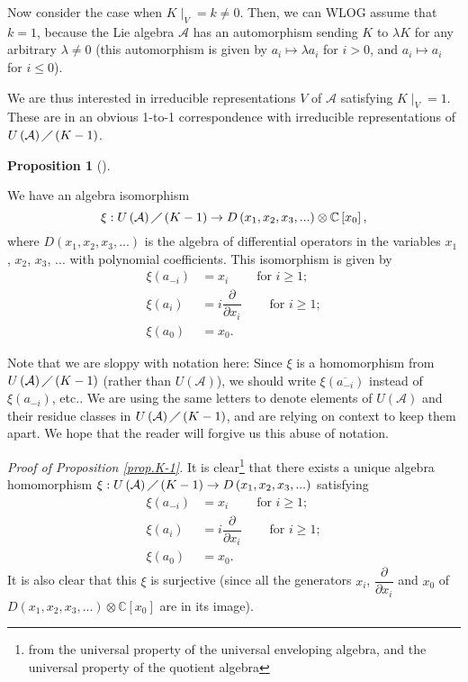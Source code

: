 \documentclass
[numbers=enddot,12pt,final,onecolumn,german,notitlepage]{scrartcl}%
\theoremstyle{definition}
\newtheorem{prop}[theo]{Proposition}
\newenvironment{proposition}[1][]
{\begin{prop}[#1]\begin{leftbar}}
{\end{leftbar}\end{prop}}
\begin{document}
Now consider the case when $K\mid_{V}=k\neq0$. Then, we can WLOG assume that
$k=1$, because the Lie algebra $\mathcal{A}$ has an automorphism sending $K$
to $\lambda K$ for any arbitrary $\lambda\neq0$ (this automorphism is given by
$a_{i}\mapsto\lambda a_{i}$ for $i>0$, and $a_{i}\mapsto a_{i}$ for $i\leq0$).

We are thus interested in irreducible representations $V$ of $\mathcal{A}$
satisfying $K\mid_{V}=1$. These are in an obvious 1-to-1 correspondence with
irreducible representations of $U\left(  \mathcal{A}\right)  \diagup\left(
K-1\right)  $.

\begin{proposition}
\label{prop.K-1}We have an algebra isomorphism%
\[
\xi:U\left(  \mathcal{A}\right)  \diagup\left(  K-1\right)  \rightarrow
D\left(  x_{1},x_{2},x_{3},...\right)  \otimes\mathbb{C}\left[  x_{0}\right]
,
\]
where $D\left(  x_{1},x_{2},x_{3},...\right)  $ is the algebra of differential
operators in the variables $x_{1}$, $x_{2}$, $x_{3}$, $...$ with polynomial
coefficients. This isomorphism is given by%
\begin{align*}
\xi\left(  a_{-i}\right)   &  =x_{i}\ \ \ \ \ \ \ \ \ \ \text{for }i\geq1;\\
\xi\left(  a_{i}\right)   &  =i\dfrac{\partial}{\partial x_{i}}%
\ \ \ \ \ \ \ \ \ \ \text{for }i\geq1;\\
\xi\left(  a_{0}\right)   &  =x_{0}.
\end{align*}

\end{proposition}

Note that we are sloppy with notation here: Since $\xi$ is a homomorphism from
$U\left(  \mathcal{A}\right)  \diagup\left(  K-1\right)  $ (rather than
$U\left(  \mathcal{A}\right)  $), we should write $\xi\left(  \overline
{a_{-i}}\right)  $ instead of $\xi\left(  a_{-i}\right)  $, etc.. We are using
the same letters to denote elements of $U\left(  \mathcal{A}\right)  $ and
their residue classes in $U\left(  \mathcal{A}\right)  \diagup\left(
K-1\right)  $, and are relying on context to keep them apart. We hope that the
reader will forgive us this abuse of notation.

\textit{Proof of Proposition \ref{prop.K-1}.} It is clear\footnote{from the
universal property of the universal enveloping algebra, and the universal
property of the quotient algebra} that there exists a unique algebra
homomorphism $\xi:U\left(  \mathcal{A}\right)  \diagup\left(  K-1\right)
\rightarrow D\left(  x_{1},x_{2},x_{3},...\right)  $ satisfying%
\begin{align*}
\xi\left(  a_{-i}\right)   &  =x_{i}\ \ \ \ \ \ \ \ \ \ \text{for }i\geq1;\\
\xi\left(  a_{i}\right)   &  =i\dfrac{\partial}{\partial x_{i}}%
\ \ \ \ \ \ \ \ \ \ \text{for }i\geq1;\\
\xi\left(  a_{0}\right)   &  =x_{0}.
\end{align*}
It is also clear that this $\xi$ is surjective (since all the generators
$x_{i}$, $\dfrac{\partial}{\partial x_{i}}$ and $x_{0}$ of $D\left(
x_{1},x_{2},x_{3},...\right)  \otimes\mathbb{C}\left[  x_{0}\right]  $ are in
its image).
\end{document}
